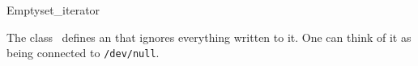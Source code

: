   
  




\begin{ccRefClass}{Emptyset_iterator}
  \label{sectionEmptysetIterator}

  
  \ccDefinition The class \ccClassName\ defines an
   that ignores everything written to it. One can
  think of it as being connected to \texttt{/dev/null}.


  \ccIsModel
  
  \ccCreation

  
  
  \ccSeeAlso
  \\

\end{ccRefClass}

